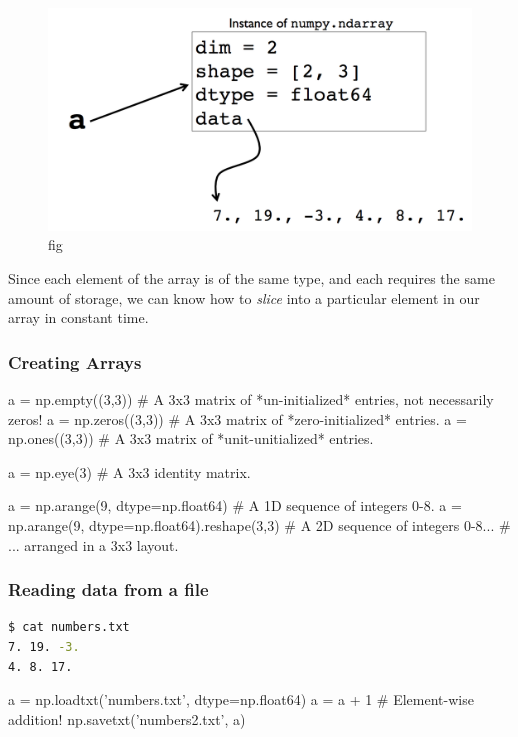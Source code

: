 \documentclass[12pt,letterpaper,twoside]{article}
\begin{document}
\begin{figure}[h]
\centering
\includegraphics[scale=0.45]{fig/numpy-representation.png}
\caption{fig}
\end{figure}

Since each element of the array is of the same type, and each requires
the same amount of storage, we can know how to \emph{slice} into a
particular element in our array in constant time.

\subsubsection{Creating Arrays}

\begin{python}
a = np.empty((3,3))   # A 3x3 matrix of *un-initialized* entries, not necessarily zeros!
a = np.zeros((3,3))   # A 3x3 matrix of *zero-initialized* entries.
a = np.ones((3,3))    # A 3x3 matrix of *unit-unitialized* entries.

a = np.eye(3)         # A 3x3 identity matrix.

a = np.arange(9, dtype=np.float64)               # A 1D sequence of integers 0-8.
a = np.arange(9, dtype=np.float64).reshape(3,3)  # A 2D sequence of integers 0-8...
                                                 # ... arranged in a 3x3 layout.
\end{python}

\subsubsection{Reading data from a file}

\begin{lstlisting}[language=bash]
$ cat numbers.txt
7. 19. -3.
4. 8. 17.
\end{lstlisting}

\begin{python}
a = np.loadtxt('numbers.txt', dtype=np.float64)
a = a + 1      # Element-wise addition!
np.savetxt('numbers2.txt', a)
\end{python}
\end{document}
